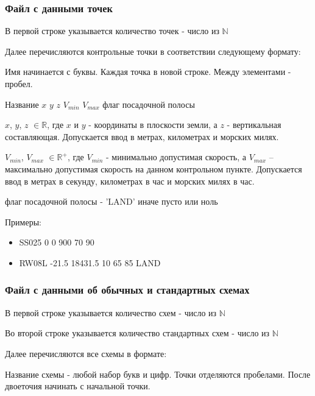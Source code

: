 \documentclass[12pt, a4 paper]{article}
\theoremstyle{plain}
\begin{document}
\subsubsection{Файл с данными точек}

В первой строке указывается количество точек - число из $\mathbb{N}$

Далее перечисляются контрольные точки в соответствии следующему формату:

Имя начинается с буквы. Каждая точка в новой строке. Между элементами - пробел.

\bigskip

\begin{center}
Название $x$ $y$ $z$ $V_{min}$ $V_{max}$ флаг посадочной полосы
\end{center}

\bigskip

$x$, $y$, $z$ $\in \mathbb{R}$, где $x$ и $y$ - координаты в плоскости земли, а $z$ - вертикальная составляющая. Допускается ввод в метрах, километрах и морских милях.

$V_{min}$, $V_{max}$ $\in \mathbb{R}^+$, где $V_{min}$ - минимально допустимая скорость, а $V_{max}$ -- максимально допустимая скорость на данном контрольном пункте. Допускается ввод в метрах в секунду, километрах в час и морских милях в час.

флаг посадочной полосы -  'LAND' иначе пусто или ноль

Примеры:

\begin{itemize}
	\item  SS025 0 0 900 70 90
	\item  RW08L -21.5 18431.5 10 65 85 LAND
\end{itemize}


\subsubsection{Файл с данными об обычных и стандартных схемах}


В первой строке указывается количество схем - число из $\mathbb{N}$

Во второй строке указывается количество стандартных схем  - число из $\mathbb{N}$

Далее перечисляются все схемы в формате:

Название схемы - любой набор букв и цифр. Точки отделяются пробелами. После двоеточия начинать с начальной точки.
\end{document}
